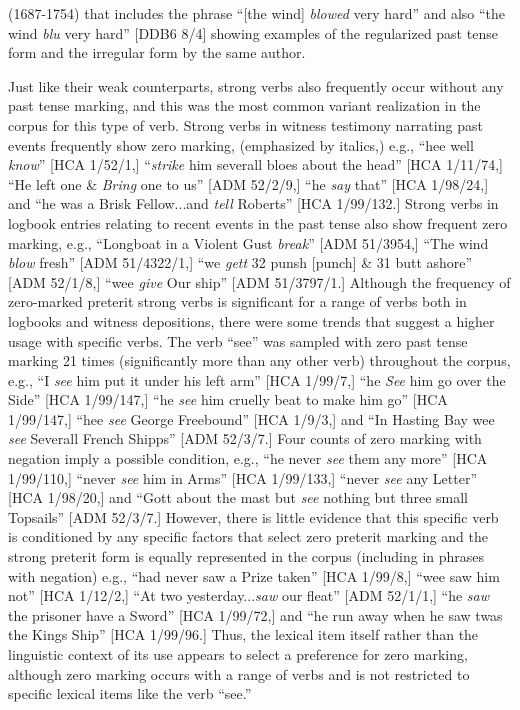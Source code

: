 \begin{styleStandard}
(1687-1754) that includes the phrase “[the wind] \textit{blowed} very hard” and also “the wind \textit{blu} very hard” [DDB6 8/4] showing examples of the regularized past tense form and the irregular form by the same author. 
\end{styleStandard}

\begin{styleStandard}
Just like their weak counterparts, strong verbs also frequently occur without any past tense marking, and this was the most common variant realization in the corpus for this type of verb. Strong verbs in witness testimony narrating past events frequently show zero marking, (emphasized by italics,) e.g., “hee well\textit{ know}” [HCA 1/52/1,] “\textit{strike} him severall bloes about the head” [HCA 1/11/74,] “He left one \&\textit{ Bring} one to us” [ADM 52/2/9,] “he \textit{say} that” [HCA 1/98/24,] and “he was a Brisk Fellow...and\textit{ tell} Roberts” [HCA 1/99/132.] Strong verbs in logbook entries relating to recent events in the past tense also show frequent zero marking, e.g., “Longboat in a Violent Gust \textit{break}” [ADM 51/3954,] “The wind \textit{blow} fresh” [ADM 51/4322/1,] “we \textit{gett} 32 punsh [punch] \& 31 butt ashore” [ADM 52/1/8,] “wee \textit{give} Our ship” [ADM 51/3797/1.] Although the frequency of zero-marked preterit strong verbs is significant for a range of verbs both in logbooks and witness depositions, there were some trends that suggest a higher usage with specific verbs. The verb “see” was sampled with zero past tense marking 21 times (significantly more than any other verb) throughout the corpus, e.g., “I \textit{see} him put it under his left arm” [HCA 1/99/7,] “he \textit{See} him go over the Side” [HCA 1/99/147,] “he\textit{ see} him cruelly beat to make him go” [HCA 1/99/147,] “hee \textit{see} George Freebound” [HCA 1/9/3,] and “In Hasting Bay wee \textit{see} Severall French Shipps” [ADM 52/3/7.] Four counts of zero marking with negation imply a possible condition, e.g., “he never \textit{see} them any more” [HCA 1/99/110,] “never\textit{ see} him in Arms” [HCA 1/99/133,] “never\textit{ see} any Letter” [HCA 1/98/20,] and “Gott about the mast but \textit{see} nothing but three small Topsails” [ADM 52/3/7.] However, there is little evidence that this specific verb is conditioned by any specific factors that select zero preterit marking and the strong preterit form is equally represented in the corpus (including in phrases with negation) e.g., “had never saw a Prize taken” [HCA 1/99/8,] “wee saw him not” [HCA 1/12/2,] “At two yesterday...\textit{saw} our fleat” [ADM 52/1/1,] “he \textit{saw} the prisoner have a Sword” [HCA 1/99/72,] and “he run away when he saw twas the Kings Ship” [HCA 1/99/96.] Thus, the lexical item itself rather than the linguistic context of its use appears to select a preference for zero marking, although zero marking occurs with a range of verbs and is not restricted to specific lexical items like the verb “see.”
\end{styleStandard}

